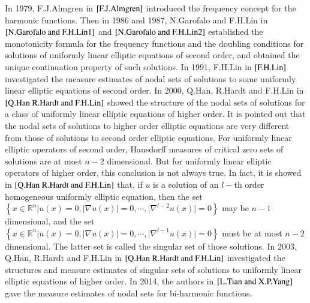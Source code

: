 \documentclass[a4paper, 12pt, onecolumn]{article} \textwidth 148mm
\begin{document}
In 1979, F.J.Almgren in $\cite{F.J.Almgren}$ introduced the frequency concept for the harmonic functions. Then in 1986 and 1987, N.Garofalo and F.H.Lin in $\cite{N.Garofalo and F.H.Lin1}$ and $\cite{N.Garofalo and F.H.Lin2}$ established the monotonicity formula for the frequency functions and the doubling conditions for solutions of  uniformly linear elliptic equations of second order, and obtained the unique continuation property of such solutions. In 1991, F.H.Lin in $\cite{F.H.Lin}$ investigated the measure estimates of nodal sets of solutions to some uniformly linear elliptic equations of second order. In 2000, Q.Han, R.Hardt and F.H.Lin in $\cite{Q.Han R.Hardt and F.H.Lin}$ showed the structure of the nodal sets of solutions for a class of uniformly linear elliptic equations of higher order. It is pointed out that the nodal sets of solutions to higher order elliptic equations are very different from those of solutions to second order elliptic equations. For uniformly linear elliptic operators of second order, Hausdorff measures of critical zero sets of solutions are at most $n-2$ dimensional. But for uniformly linear elliptic operators of higher order, this conclusion is not always true. In fact, it is showed in $\cite{Q.Han R.Hardt and F.H.Lin}$ that, if $u$ is a solution of an $l-$th order homogeneous uniformly elliptic equation, then the set $\left\{x\in\mathbb{R}^n|u(x)=0,|\nabla u(x)|=0,\cdots, |\nabla^{l-2}u(x)|=0\right\}$ may be $n-1$ dimensional, and the set $\left\{x\in\mathbb{R}^n|u(x)=0,|\nabla u(x)|=0,\cdots, |\nabla^{l-1}u(x)|=0\right\}$ must be at most $n-2$ dimensional. The latter set is called the singular set of those solutions.  In 2003, Q.Han, R.Hardt and F.H.Lin in $\cite{Q.Han R.Hardt and F.H.Lin}$ investigated the structures and measure estimates of singular sets of solutions to uniformly linear elliptic equations of higher order. In 2014, the authors in $\cite{L.Tian and X.P.Yang}$ gave the measure estimates of nodal sets for bi-harmonic functions.
\end{document}
